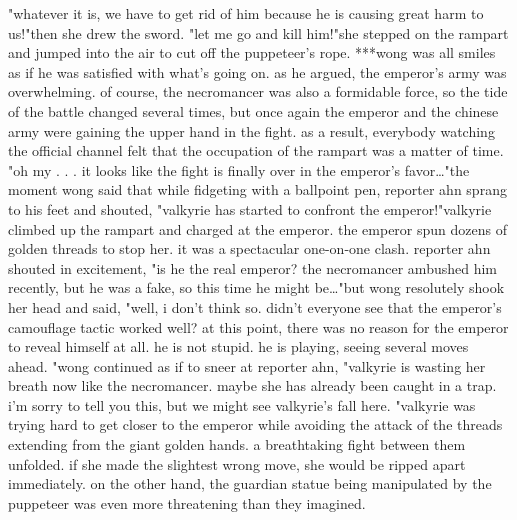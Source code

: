 "whatever it is, we have to get rid of him because he is causing great harm to us!"then she drew the sword.
"let me go and kill him!"she stepped on the rampart and jumped into the air to cut off the puppeteer's rope.
***wong was all smiles as if he was satisfied with what's going on.
 as he argued, the emperor's army was overwhelming.
of course, the necromancer was also a formidable force, so the tide of the battle changed several times, but once again the emperor and the chinese army were gaining the upper hand in the fight.
 as a result, everybody watching the official channel felt that the occupation of the rampart was a matter of time.
"oh my .
.
.
it looks like the fight is finally over in the emperor's favor…"the moment wong said that while fidgeting with a ballpoint pen, reporter ahn sprang to his feet and shouted, "valkyrie has started to confront the emperor!"valkyrie climbed up the rampart and charged at the emperor.
 the emperor spun dozens of golden threads to stop her.
 it was a spectacular one-on-one clash.
reporter ahn shouted in excitement, "is he the real emperor? the necromancer ambushed him recently, but he was a fake, so this time he might be…"but wong resolutely shook her head and said, "well, i don't think so.
 didn't everyone see that the emperor's camouflage tactic worked well? at this point, there was no reason for the emperor to reveal himself at all.
 he is not stupid.
 he is playing, seeing several moves ahead.
"wong continued as if to sneer at reporter ahn, "valkyrie is wasting her breath now like the necromancer.
 maybe she has already been caught in a trap.
 i'm sorry to tell you this, but we might see valkyrie's fall here.
"valkyrie was trying hard to get closer to the emperor while avoiding the attack of the threads extending from the giant golden hands.
a breathtaking fight between them unfolded.
 if she made the slightest wrong move, she would be ripped apart immediately.
 on the other hand, the guardian statue being manipulated by the puppeteer was even more threatening than they imagined.

